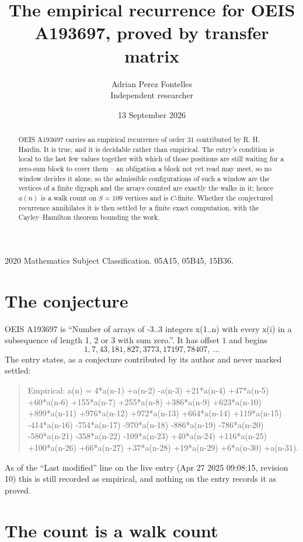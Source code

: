 \documentclass[11pt,a4paper]{article}
\title{The empirical recurrence for OEIS A193697, proved by transfer matrix}
\author{Adrian Perez Fontelles\\ \small Independent researcher}
\date{13 September 2026}
\theoremstyle{plain}
\theoremstyle{definition}
\begin{document}
\maketitle

\begin{abstract}
OEIS A193697 carries an empirical recurrence of order $31$ contributed by R. H. Hardin. It is
true, and it is decidable rather than empirical. The entry's condition is local to the last few values together with which of those positions are still waiting for a zero-sum block to cover them -- an obligation a block not yet read may meet, so no window decides it alone, so
the admissible configurations of such a window are the vertices of a finite digraph and the
arrays counted are exactly the walks in it; hence $a(n)$ is a walk count on $S=109$ vertices
and is $C$-finite. Whether the conjectured recurrence annihilates it is then settled by a
finite exact computation, with the Cayley--Hamilton theorem bounding the work.
\end{abstract}

\noindent\small 2020 Mathematics Subject Classification. 05A15, 05B45, 15B36.\normalsize

\section{The conjecture}

OEIS A193697 is ``Number of arrays of -3..3 integers x(1..n) with every x(i) in a subsequence of length 1, 2 or 3 with sum zero.''. It has offset $1$ and begins
\[
1, 7, 43, 181, 827, 3773, 17197, 78407,\ \dots
\]
The entry states, as a conjecture contributed by its author and never marked settled:
\begin{quote}
Empirical: a(n) = 4*a(n-1) +a(n-2) -a(n-3) +21*a(n-4) +47*a(n-5) +60*a(n-6) +155*a(n-7) +255*a(n-8) +386*a(n-9) +623*a(n-10) +899*a(n-11) +976*a(n-12) +972*a(n-13) +664*a(n-14) +119*a(n-15) -414*a(n-16) -754*a(n-17) -970*a(n-18) -886*a(n-19) -786*a(n-20) -580*a(n-21) -358*a(n-22) -109*a(n-23) +40*a(n-24) +116*a(n-25) +100*a(n-26) +66*a(n-27) +37*a(n-28) +19*a(n-29) +6*a(n-30) +a(n-31).
\end{quote}
As of the ``Last modified'' line on the live entry (Apr 27 2025 09:08:15, revision 10) this is still
recorded as empirical, and nothing on the entry records it as proved.

\section{The count is a walk count}
\end{document}
